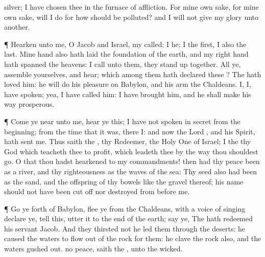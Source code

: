 {silver; I have
chosen thee in the
furnace of
affliction.
For mine own sake,
{} for mine own sake, will I
do
{} for how should
{} be
polluted? and I will not
give my
glory unto
another.
\par }{\PP {}¶
Hearken unto me, O
Jacob and
Israel, my
called; I
{} he; I
{} the
first, I also
{} the
last.
Mine
hand also hath laid the
foundation of the
earth, and my right
hand hath
spanned the
heavens:
{} I
call unto them, they stand
up
together.
All ye,
assemble yourselves, and
hear; which among them hath
declared these
{}? The
{} hath
loved him: he will
do his
pleasure on
Babylon, and his
arm
{} the
Chaldeans.
I,
{} I, have
spoken; yea, I have
called him: I have
brought him, and he shall make his
way
prosperous.
\par }{\PP {}¶
Come ye
near unto me,
hear ye this; I have not
spoken in
secret from the
beginning; from the
time that it was, there
{} I: and now the
Lord
{}, and his
Spirit, hath
sent me.
Thus
saith the
{}, thy
Redeemer, the Holy
One of
Israel; I
{} the
{} thy
God which
teacheth thee to
profit, which
leadeth thee by the
way
{} thou shouldest
go.
O
that thou hadst
hearkened to my
commandments! then had thy
peace been as a
river, and thy
righteousness as the
waves of the
sea:
Thy
seed also had been as the
sand, and the
offspring of thy
bowels like the
gravel thereof; his
name should not have been cut
off nor
destroyed from
before me.
\par }{\PP {}¶ Go ye
forth of
Babylon,
flee ye from the
Chaldeans, with a
voice of
singing
declare ye,
tell this,
utter it
{} to the
end of the
earth;
say ye, The
{} hath
redeemed his
servant
Jacob.
And they
thirsted not
{} he
led them through the
deserts: he caused the
waters to
flow out of the
rock for them: he
clave the
rock also, and the
waters gushed
out.
 no
peace,
saith the
{}, unto the
wicked.

}
